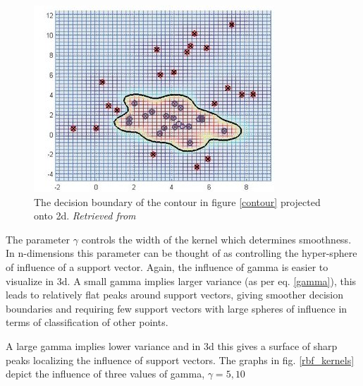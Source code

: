 \documentclass[final,3p,times,twocolumn]{elsarticle}
\begin{document}
\begin{figure}
\hspace{-1cm}\includegraphics[scale=0.7]{Images/contour_2d_decision.jpg}
\caption{The decision boundary of the contour in figure \ref{contour} projected onto 2d. \textit{Retrieved from \cite{RBF2}}}
\end{figure}

The parameter $\gamma$ controls the width of the kernel which determines smoothness. In n-dimensions this parameter can be thought of as controlling the hyper-sphere of influence of a support vector. Again, the influence of gamma is easier to visualize in 3d. A small gamma implies larger variance (as per eq. \ref{gamma}), this leads to relatively flat peaks around support vectors, giving smoother decision boundaries and requiring few support vectors with large spheres of influence in terms of classification of other points. 

A large gamma implies lower variance and in 3d this gives a surface of sharp peaks localizing the influence of support vectors. The graphs in fig. \ref{rbf_kernels} depict the influence of three values of gamma, $\gamma = 5,10$ 
\end{document}
